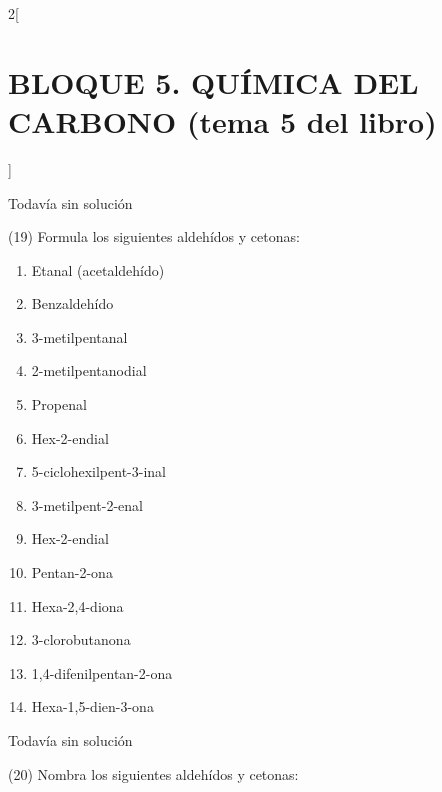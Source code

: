 \documentclass[10pt]{article}
\begin{document}
\begin{multicols}{2}[
  \section{BLOQUE 5. QUÍMICA DEL CARBONO (tema 5 del libro)}
  ]
\begin{solution}[print=false]
  Todavía sin solución
\end{solution}





\begin{exercise}[
    tags    = {},
    topics  = {química,química básica},
    source  = {FQ 1B MGH 2016, p85, e26},
  ]

  (19) Formula los siguientes aldehídos y cetonas:
  \begin{enumerate}
    \item Etanal (acetaldehído)
    \item Benzaldehído
    \item 3-metilpentanal
    \item 2-metilpentanodial
    \item Propenal
    \item Hex-2-endial
    \item 5-ciclohexilpent-3-inal
    \item 3-metilpent-2-enal
    \item Hex-2-endial
    \item Pentan-2-ona
    \item Hexa-2,4-diona
    \item 3-clorobutanona
    \item 1,4-difenilpentan-2-ona
    \item Hexa-1,5-dien-3-ona
  \end{enumerate}
\end{exercise}

\begin{solution}[print=false]
  Todavía sin solución
\end{solution}




\begin{exercise}[
    tags    = {},
    topics  = {química,química básica},
    source  = {FQ 1B MGH 2016, p85, e26},
  ]

  (20) Nombra los siguientes aldehídos y cetonas:


\end{exercise}
\end{multicols}
\end{document}
